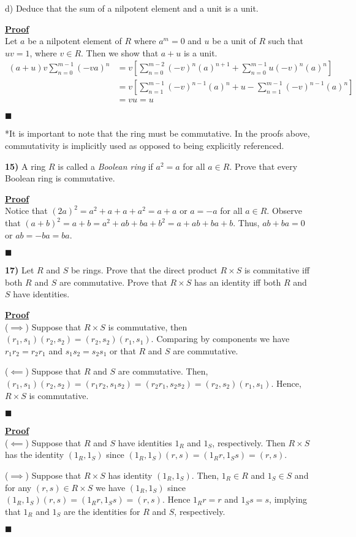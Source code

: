 \documentclass[12pt,a4paper]{article}
\newcommand{\prob}[2]{\textbf{#1)} #2}
\newenvironment{proof}
{
\textbf{\underline{Proof}} \\
}
{
\begin{flushright}
$\blacksquare$
\end{flushright}}
\begin{document}
d) Deduce that the sum of a nilpotent element and a unit is a unit.

\begin{proof}
Let $a$ be a nilpotent element of $R$ where $a^m = 0$ and $u$ be a unit of $R$ such that $uv = 1$, where $v \in R$. Then we show that $a + u$ is a unit.
\begin{align*}
(a+u)v\sum_{n=0}^{m-1} (-va)^n &= v\left[\sum_{n=0}^{m-2} (-v)^n(a)^{n+1} + \sum_{n=0}^{m-1} u(-v)^n(a)^n \right] \\
&= v\left[\sum_{n=1}^{m-1} (-v)^{n-1}(a)^{n} + u - \sum_{n=1}^{m-1} (-v)^{n-1}(a)^n \right] \\
&= vu = u
\end{align*}
\end{proof}

*It is important to note that the ring must be commutative. In the proofs above, commutativity is implicitly used as opposed to being explicitly referenced.

\prob{15}{A ring $R$ is called a \textit{Boolean ring} if $a^2 = a$ for all $a \in R$. Prove that every Boolean ring is commutative.}

\begin{proof}
Notice that $(2a)^2 = a^2 + a + a + a^2 = a + a$ or $a = -a$ for all $a \in R$. Observe that $(a + b)^2 = a + b = a^2 + ab + ba + b^2 = a + ab + ba + b$. Thus, $ab + ba = 0$ or $ab = -ba = ba$. 
\end{proof}

\prob{17}{Let $R$ and $S$ be rings. Prove that the direct product $R \times S$ is commitative iff both $R$ and $S$ are commutative. Prove that $R \times S$ has an identity iff both $R$ and $S$ have identities.}

\begin{proof}
($\implies$) Suppose that $R \times S$ is commutative, then $(r_1,s_1)(r_2,s_2) = (r_2,s_2)(r_1,s_1)$. Comparing by components we have $r_1r_2 = r_2r_1$ and $s_1s_2 = s_2s_1$ or that $R$ and $S$ are commutative.

($\impliedby$) Suppose that $R$ and $S$ are commutative. Then, $(r_1,s_1)(r_2,s_2) = (r_1r_2,s_1s_2) = (r_2r_1,s_2s_2) = (r_2,s_2)(r_1,s_1)$. Hence, $R \times S$ is commutative.
\end{proof}

\begin{proof}
($\impliedby$) Suppose that $R$ and $S$ have identities $1_R$ and $1_S$, respectively. Then $R \times S$ has the identity $(1_R,1_S)$ since $(1_R,1_S)(r,s) = (1_Rr,1_Ss) = (r,s)$.

($\implies$) Suppose that $R \times S$ has identity $(1_R,1_S)$. Then, $1_R \in R$ and $1_S \in S$ and for any $(r,s) \in R \times S$ we have $(1_R,1_S)$ since $(1_R,1_S)(r,s) = (1_Rr,1_Ss) = (r,s)$. Hence $1_Rr = r$ and $1_Ss = s$, implying that $1_R$ and $1_S$ are the identities for $R$ and $S$, respectively.
\end{proof}
\end{document}
